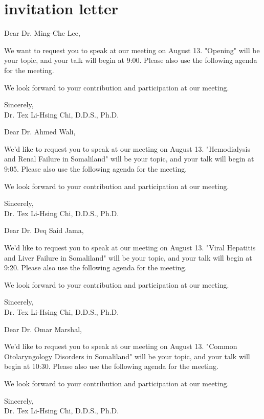 \documentclass[25pt, a4paper]{letter}
\newcommand{\yourName}{Dr. Tex Li-Hsing Chi, D.D.S., Ph.D.}
\begin{document}
\section{invitation letter}


Dear Dr. Ming-Che Lee,

We want to request you to speak at our meeting on August 13. "Opening" will be your topic, and your talk will begin at 9:00.
Please also use the following agenda for the meeting.

We look forward to your contribution and participation at our meeting.

Sincerely, \\
\yourName




\clearpage



Dear Dr. Ahmed Wali,

We'd like to request you to speak at our meeting on August 13. "Hemodialysis and Renal Failure in Somaliland" will be your topic, and your talk will begin at 9:05. Please also use the following agenda for the meeting.

We look forward to your contribution and participation at our meeting.

Sincerely, \\
\yourName

\clearpage

Dear Dr. Deq Said Jama,

We'd like to request you to speak at our meeting on August 13. "Viral Hepatitis and Liver Failure in Somaliland" will be your topic, and your talk will begin at 9:20. Please also use the following agenda for the meeting.

We look forward to your contribution and participation at our meeting.

Sincerely, \\
\yourName


\clearpage
Dear Dr. Omar Marshal,

We'd like to request you to speak at our meeting on August 13. "Common Otolaryngology Disorders in Somaliland" will be your topic, and your talk will begin at 10:30. Please also use the following agenda for the meeting.

We look forward to your contribution and participation at our meeting.

Sincerely, \\
\yourName
\end{document}
